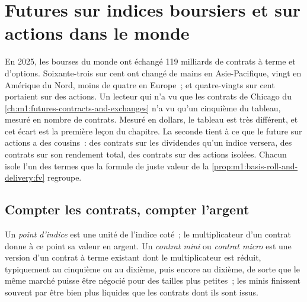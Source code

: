 \chapter{Futures sur indices boursiers et sur actions dans le monde}\label{ch:m1:index-and-single-stock-futures-worldwide}

En 2025, les bourses du monde ont échangé 119 milliards de contrats à terme
et d'options. Soixante-trois sur cent ont changé de mains en Asie-Pacifique,
vingt en Amérique du Nord, moins de quatre en Europe~; et quatre-vingts sur cent
portaient sur des actions. Un lecteur qui n'a vu que les contrats de Chicago du
\cref{ch:m1:futures-contracts-and-exchanges} n'a vu qu'un cinquième du tableau,
mesuré en nombre de contrats. Mesuré en dollars, le tableau est très différent,
et cet écart est la première leçon du chapitre. La seconde tient à ce que le
future sur actions a des cousins~: des contrats sur les dividendes qu'un indice
versera, des contrats sur son rendement total, des contrats sur des actions
isolées. Chacun isole l'un des termes que la formule de juste valeur de la
\cref{prop:m1:basis-roll-and-delivery:fv} regroupe.

\section{Compter les contrats, compter l'argent}

\begin{definition}\label{def:m1:index-and-single-stock-futures-worldwide:point}
Un \emph{point d'indice} est une unité de l'indice coté~; le
multiplicateur d'un contrat donne à ce point sa valeur en argent. Un \emph{contrat
mini} ou \emph{contrat micro}
est une version d'un contrat à terme existant dont le multiplicateur est réduit, typiquement
au cinquième ou au dixième, puis encore au dixième, de sorte que le même marché puisse être
négocié pour des tailles plus petites~; les minis finissent souvent par être bien plus
liquides que les contrats dont ils sont issus.
\end{definition}


